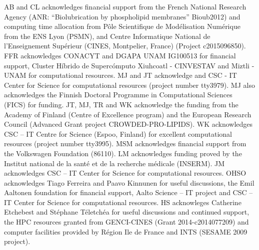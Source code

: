 \documentclass[journal=jacsat,manuscript=article]{achemso}
\begin{document}






\begin{acknowledgement}

AB and CL acknowledges financial support from the French National Research Agency
(ANR: “Biolubrication by phospholipid membranes” Bioub2012) and
computing time allocation from P{\^o}le Scientifique de Mod{\'e}lisation Num{\'e}rique from the ENS Lyon (PSMN),
and Centre Informatique National de l'Enseignement Sup{\'e}rieur (CINES, Montpelier, France)
(Project c2015096850).
FFR acknowledges CONACYT and DGAPA UNAM IG100513
for financial support, Cluster H\'ibrido de Superc\'omputo Xiuhcoatl - CINVESTAV and Miztli - UNAM for computational resources. 
MJ and JT acknowledge and CSC - IT Center for Science for computational resources (project number tty3979).
MJ also acknowledges the Finnish Doctoral Programme in Computational Sciences (FICS) for funding.
JT, MJ, TR and WK acknowledge the funding from the Academy of Finland (Centre of Excellence program) 
and the European Research Council (Advanced Grant project CROWDED-PRO-LIPIDS).
WK acknowledges CSC -- IT Centre for Science (Espoo, Finland) for excellent computational resources (project number tty3995).
MSM acknowledges financial support from the Volkswagen Foundation (86110).
LM acknowledges funding proved by the Institut national de la sant\'e et de la recherche m\'edicale (INSERM).
JM acknowledges CSC -- IT Center for Science for computational resources.
OHSO acknowledges Tiago Ferreira and Paavo Kinnunen for useful discussions, 
the Emil Aaltonen foundation for financial support, 
Aalto Science -- IT project and CSC -- IT Center for Science for computational resources. 
HS acknowleges Catherine Etchebest and St\'ephane T\'eletch\'ea for useful discussions and continued support, the HPC 
resources granted from GENCI-CINES (Grant 2014-c2014077209) and computer facilities provided by R\'egion Ile de France and INTS (SESAME 2009 project).

\end{acknowledgement}
\end{document}
